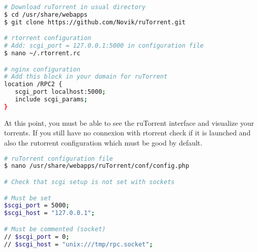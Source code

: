 \begin{lstlisting}[language=bash,caption=ruTorrent installation and setup]
# Download ruTorrent in usual directory
$ cd /usr/share/webapps
$ git clone https://github.com/Novik/ruTorrent.git

# rtorrent configuration
# Add: scgi_port = 127.0.0.1:5000 in configuration file
$ nano ~/.rtorrent.rc

# nginx configuration
# Add this block in your domain for ruTorrent
location /RPC2 {
   scgi_port localhost:5000;
   include scgi_params;
}
\end{lstlisting}

At this point, you must be able to see the ruTorrent interface and visualize your 
torrents. If you still have no connexion with rtorrent check if it is launched and 
also the rutorrent configuration which must be good by default.

\begin{lstlisting}[language=bash,caption=Check ruTorrent configuration]
# ruTorrent configuration file
$ nano /usr/share/webapps/ruTorrent/conf/config.php

# Check that scgi setup is not set with sockets

# Must be set
$scgi_port = 5000;
$scgi_host = "127.0.0.1";

# Must be commented (socket)
// $scgi_port = 0;
// $scgi_host = "unix:///tmp/rpc.socket";
\end{lstlisting}


%
